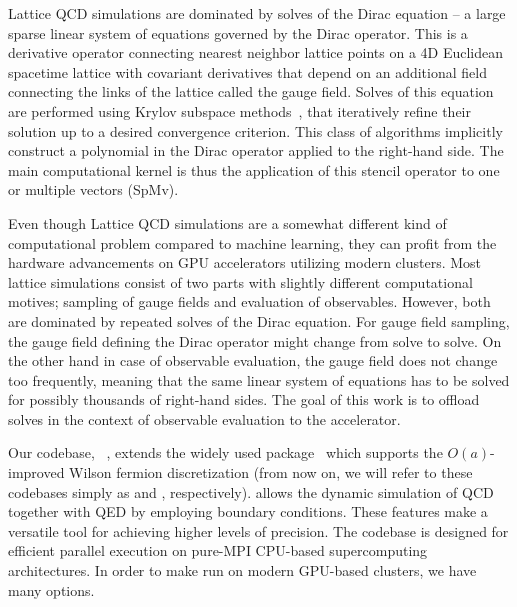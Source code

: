 Lattice QCD simulations are dominated by solves of the Dirac equation -- a large sparse linear system of equations governed by the Dirac operator.
This is a derivative operator connecting nearest neighbor lattice points on a 4D Euclidean spacetime lattice with covariant derivatives that depend on an additional field connecting the links of the lattice called the gauge field.
Solves of this equation are performed using Krylov subspace methods~\cite{krylov1931numerical,book:saad2003iterative}, that iteratively refine their solution up to a desired convergence criterion.
This class of algorithms implicitly construct a polynomial in the Dirac operator applied to the right-hand side.
The main computational kernel is thus the application of this stencil operator to one or multiple vectors (SpMv).

Even though Lattice QCD simulations are a somewhat different kind of computational problem compared to machine learning, they can profit from the hardware advancements
on GPU accelerators utilizing modern clusters.
Most lattice simulations consist of two parts with slightly different computational motives; sampling of gauge fields and evaluation of observables.
However, both are dominated by repeated solves of the Dirac equation.
For gauge field sampling, the gauge field defining the Dirac operator might change from solve to solve.
On the other hand in case of observable evaluation, the gauge field does not change too frequently, meaning that the same linear system of equations has to be solved for possibly thousands of right-hand sides.
The goal of this work is to offload solves in the context of observable evaluation to the accelerator.


Our codebase, \openqxd~\cite{openqxd,gitlab:openqxd}, extends the widely used  package~\cite{online:openqcd} which supports the $O(a)$-improved Wilson fermion discretization (from now on, we will refer to these codebases simply as \openqxd and \openqcd, respectively).
\Openqxd allows the dynamic simulation of QCD together with QED by employing \Cstar boundary conditions.
These features make \openqxd a versatile tool for achieving higher levels of precision.
The codebase is designed for efficient parallel execution on pure-MPI CPU-based supercomputing architectures.
In order to make \openqxd run on modern GPU-based clusters, we have many options.


